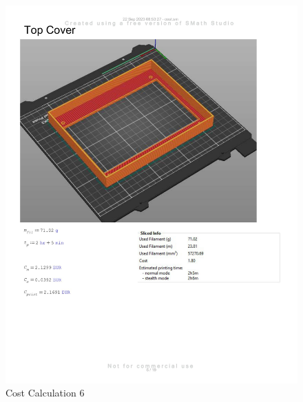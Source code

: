 \begin{figure}[H]
    \centering
    \includegraphics[width=\linewidth]{texs/appendix/data/costcalculation/cost1-06.jpg}
    \caption{Cost Calculation 6}
    \label{fig:cost-calculation-6}
\end{figure}

